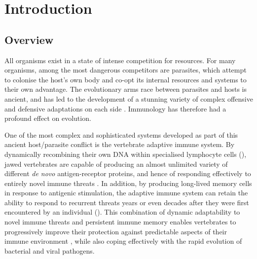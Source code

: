 \chapter{Introduction}
\label{chap:intro}
\onehalfspacing

\pagebreak

\section{Overview}
\label{sec:intro_overview}

All organisms exist in a state of intense competition for resources. For many organisms, among the most dangerous competitors are parasites, which attempt to colonise the host's own body and co-opt its internal resources and systems to their own advantage. The evolutionary arms race between parasites and hosts is ancient, and has led to the development of a stunning variety of complex offensive and defensive adaptations on each side \parencite{jack2015evolution}. Immunology has therefore had a profound effect on evolution.

One of the most complex and sophisticated systems developed as part of this ancient host/parasite conflict is the vertebrate adaptive immune system. By dynamically recombining their own DNA within specialised lymphocyte cells (), jawed vertebrates are capable of producing an almost unlimited variety of different \textit{de novo} antigen-receptor proteins, and hence of responding effectively to entirely novel immune threats \parencite{jack2015evolution}. In addition, by producing long-lived memory cells in response to antigenic stimulation, the adaptive immune system can retain the ability to respond to recurrent threats years or even decades after they were first encountered by an individual \parencite{kurosaki2015memory} (). This combination of dynamic adaptability to novel immune threats and persistent immune memory enables vertebrates to progressively improve their protection against predictable aspects of their immune environment \parencite{mayer2018memory}, while also coping effectively with the rapid evolution of bacterial and viral pathogens.

